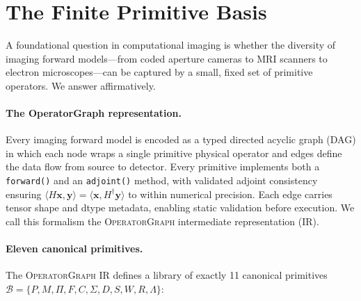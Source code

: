 \documentclass[11pt]{article}
\newcommand{\Blib}{\mathcal{B}}
\newcommand{\opg}{\textsc{OperatorGraph}}
\begin{document}
\FloatBarrier
\section*{The Finite Primitive Basis}

A foundational question in computational imaging is whether the diversity of imaging forward models---from coded aperture cameras to MRI scanners to electron microscopes---can be captured by a small, fixed set of primitive operators. We answer affirmatively.

\paragraph{The OperatorGraph representation.}
Every imaging forward model is encoded as a typed directed acyclic graph (DAG) in which each node wraps a single primitive physical operator and edges define the data flow from source to detector. Every primitive implements both a \texttt{forward()} and an \texttt{adjoint()} method, with validated adjoint consistency ensuring $\langle H\mathbf{x}, \mathbf{y} \rangle = \langle \mathbf{x}, H^{\dagger}\mathbf{y} \rangle$ to within numerical precision. Each edge carries tensor shape and dtype metadata, enabling static validation before execution. We call this formalism the \opg{} intermediate representation (IR).

\paragraph{Eleven canonical primitives.}
The \opg{} IR defines a library of exactly 11 canonical primitives $\Blib = \{P, M, \Pi, F, C, \Sigma, D, S, W, R, \Lambda\}$:
\end{document}
